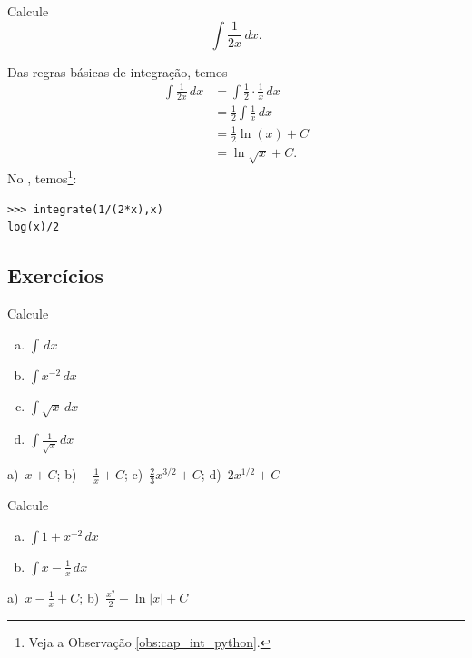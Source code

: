 \begin{exeresol}
  Calcule
  \begin{equation}
    \int \frac{1}{2x}\,dx.
  \end{equation}
\end{exeresol}
\begin{resol}
  Das regras básicas de integração, temos
  \begin{align}
    \int \frac{1}{2x}\,dx &= \int \frac{1}{2}\cdot\frac{1}{x}\,dx \\
                          &= \frac{1}{2}\int\frac{1}{x}\,dx \\
                          &= \frac{1}{2}\ln(x) + C \\
                          &= \ln\sqrt{x} + C.
  \end{align}
\ifispython
No \sympy, temos\footnote{Veja a Observação \ref{obs:cap_int_python}.}:
\begin{verbatim}
>>> integrate(1/(2*x),x)
log(x)/2
\end{verbatim}
\fi    
\end{resol}


\subsection{Exercícios}

\begin{exer}
  Calcule
  \begin{enumerate}[a)]
  \item $\displaystyle \int \,dx$
  \item $\displaystyle \int x^{-2}\,dx$
  \item $\displaystyle \int \sqrt{x}\,dx$
  \item $\displaystyle \int \frac{1}{\sqrt{x}}\,dx$
  \end{enumerate}
\end{exer}
\begin{resp}
  a)~$\displaystyle x + C$; b)~$\displaystyle -\frac{1}{x} + C$; c)~$\displaystyle \frac{2}{3}x^{3/2} + C$; d)~$\displaystyle 2x^{1/2} + C$
\end{resp}

\begin{exer}
  Calcule
  \begin{enumerate}[a)]
  \item $\displaystyle \int 1 + x^{-2}\,dx$
  \item $\displaystyle \int x - \frac{1}{x}\,dx$
  \end{enumerate}
\end{exer}
\begin{resp}
  a)~$\displaystyle x-\frac{1}{x}+C$; b)~$\displaystyle \frac{x^2}{2} - \ln|x| + C$
\end{resp}

